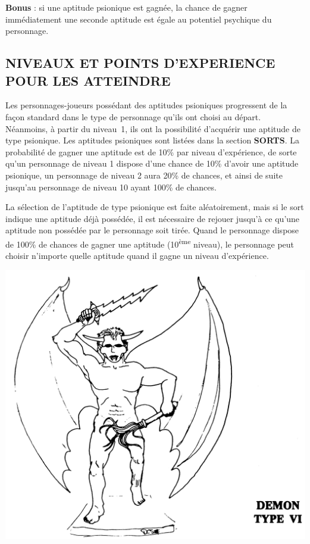 \documentclass[11pt]{article}
\begin{document}
{\bigskip

\textbf{Bonus} : si une aptitude psionique est gagnée, la chance de gagner immédiatement une seconde aptitude est égale au potentiel psychique du personnage.

\subsection*{\normalsize NIVEAUX ET POINTS D'EXPERIENCE POUR LES ATTEINDRE}

Les personnages-joueurs possédant des aptitudes psioniques progressent de la façon standard dans le type de personnage qu'ils ont choisi au départ. Néanmoins, à partir du niveau~1, ils ont la possibilité d'acquérir une aptitude de type psionique. Les aptitudes psioniques sont listées dans la section \textbf{SORTS}. La probabilité de gagner une aptitude est de 10\% par niveau d'expérience, de sorte qu'un personnage de niveau 1 dispose d'une chance de 10\% d'avoir une aptitude psionique, un personnage de niveau 2 aura 20\% de chances, et ainsi de suite jusqu'au personnage de niveau 10 ayant 100\% de chances.

\bigskip

La sélection de l'aptitude de type psionique est faite aléatoirement, mais si le sort indique une aptitude déjà possédée, il est nécessaire de rejouer  jusqu'à ce qu'une aptitude non possédée par le personnage soit tirée. Quand le personnage dispose de 100\% de chances de gagner une aptitude (10\textsuperscript{ème} niveau), le personnage peut choisir n'importe quelle aptitude quand il gagne un niveau d'expérience.

\begin{center}
\includegraphics[scale=0.17]{./images/demon-typeVI.jpg}
\end{center}

}
\end{document}
